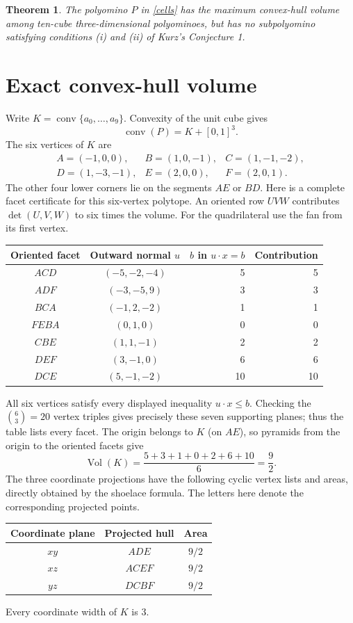 \documentclass[11pt]{article}
\newtheorem{theorem}{Theorem}
\newcommand{\conv}{\operatorname{conv}}
\newcommand{\Vol}{\operatorname{Vol}}
\begin{document}
\begin{theorem}\label{main}
The polyomino $P$ in \eqref{cells} has the maximum convex-hull volume
among ten-cube three-dimensional polyominoes, but has no subpolyomino
satisfying conditions (i) and (ii) of Kurz's Conjecture 1.
\end{theorem}

\section*{Exact convex-hull volume}
Write $K=\conv\{a_0,\ldots,a_9\}$. Convexity of the unit cube gives
\begin{equation}\label{minkowski}
\conv(P)=K+[0,1]^3.
\end{equation}
The six vertices of $K$ are
\[
\begin{array}{lll}
A=(-1,0,0),&B=(1,0,-1),&C=(1,-1,-2),\\
D=(1,-3,-1),&E=(2,0,0),&F=(2,0,1).
\end{array}
\]
The other four lower corners lie on the segments $AE$ or $BD$.
Here is a complete facet certificate for this six-vertex polytope.
An oriented row $UVW$ contributes $\det(U,V,W)$ to six times the
volume. For the quadrilateral use the fan from its first vertex.
\begin{center}
\begin{tabular}{c c r r}
\toprule
Oriented facet & Outward normal $u$ & $b$ in $u\cdot x=b$
  & Contribution\\
\midrule
$ACD$&$(-5,-2,-4)$&5&5\\
$ADF$&$(-3,-5,9)$&3&3\\
$BCA$&$(-1,2,-2)$&1&1\\
$FEBA$&$(0,1,0)$&0&0\\
$CBE$&$(1,1,-1)$&2&2\\
$DEF$&$(3,-1,0)$&6&6\\
$DCE$&$(5,-1,-2)$&10&10\\
\bottomrule
\end{tabular}
\end{center}
All six vertices satisfy every displayed inequality $u\cdot x\le b$.
Checking the $\binom63=20$ vertex triples gives precisely these seven
supporting planes; thus the table lists every facet. The origin belongs
to $K$ (on $AE$), so pyramids from the origin to the oriented facets
give
\begin{equation}\label{kvol}
\Vol(K)=\frac{5+3+1+0+2+6+10}{6}=\frac92.
\end{equation}
The three coordinate projections have the following cyclic vertex lists
and areas, directly obtained by the shoelace formula. The letters here
denote the corresponding projected points.
\begin{center}
\begin{tabular}{ccc}
\toprule
Coordinate plane & Projected hull & Area\\
\midrule
$xy$&$ADE$&$9/2$\\
$xz$&$ACEF$&$9/2$\\
$yz$&$DCBF$&$9/2$\\
\bottomrule
\end{tabular}
\end{center}
Every coordinate width of $K$ is $3$.
\end{document}
